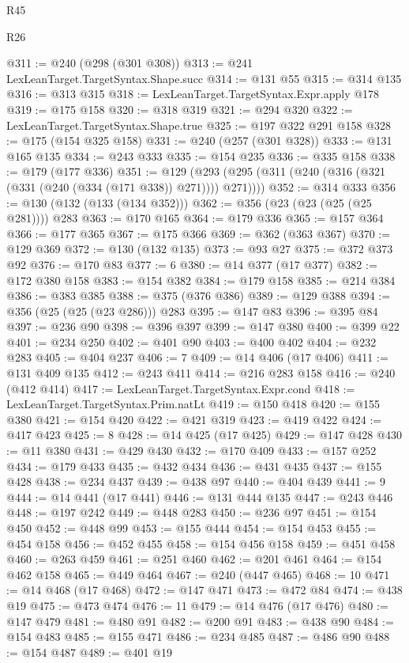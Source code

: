 \begin{lexlean}{R45}
\begin{lexlean}{R26}
\begin{coremodule}
{{{{{{{{{{{{{{{{{{{{{{{{{{{{{{{{{{{{{{{{{{{{{{{{{{{{{{{{{{{{{{{{{{{{{{{{@311 := @240 (@298 (@301 @308))
@313 := @241 LexLeanTarget.TargetSyntax.Shape.succ
@314 := @131 @55
@315 := @314 @135
@316 := @313 @315
@318 := LexLeanTarget.TargetSyntax.Expr.apply @178
@319 := @175 @158
@320 := @318 @319
@321 := @294 @320
@322 := LexLeanTarget.TargetSyntax.Shape.true
@325 := @197 @322 @291 @158
@328 := @175 (@154 @325 @158)
@331 := @240 (@257 (@301 @328))
@333 := @131 @165 @135
@334 := @243 @333
@335 := @154 @235
@336 := @335 @158
@338 := @179 (@177 @336)
@351 := @129 (@293 (@295 (@311 (@240 (@316 (@321 (@331 (@240 (@334 (@171 @338)) @271)))) @271))))
@352 := @314 @333
@356 := @130 (@132 (@133 (@134 @352)))
@362 := @356 (@23 (@23 (@25 (@25 @281)))) @283
@363 := @170 @165
@364 := @179 @336
@365 := @157 @364
@366 := @177 @365
@367 := @175 @366
@369 := @362 (@363 @367)
@370 := @129 @369
@372 := @130 (@132 @135)
@373 := @93 @27
@375 := @372 @373 @92
@376 := @170 @83
@377 := 6
@380 := @14 @377 (@17 @377)
@382 := @172 @380 @158
@383 := @154 @382
@384 := @179 @158
@385 := @214 @384
@386 := @383 @385
@388 := @375 (@376 @386)
@389 := @129 @388
@394 := @356 (@25 (@25 (@23 @286))) @283
@395 := @147 @83
@396 := @395 @84
@397 := @236 @90
@398 := @396 @397
@399 := @147 @380
@400 := @399 @22
@401 := @234 @250
@402 := @401 @90
@403 := @400 @402
@404 := @232 @283
@405 := @404 @237
@406 := 7
@409 := @14 @406 (@17 @406)
@411 := @131 @409 @135
@412 := @243 @411
@414 := @216 @283 @158
@416 := @240 (@412 @414)
@417 := LexLeanTarget.TargetSyntax.Expr.cond
@418 := LexLeanTarget.TargetSyntax.Prim.natLt
@419 := @150 @418
@420 := @155 @380
@421 := @154 @420
@422 := @421 @319
@423 := @419 @422
@424 := @417 @423
@425 := 8
@428 := @14 @425 (@17 @425)
@429 := @147 @428
@430 := @11 @380
@431 := @429 @430
@432 := @170 @409
@433 := @157 @252
@434 := @179 @433
@435 := @432 @434
@436 := @431 @435
@437 := @155 @428
@438 := @234 @437
@439 := @438 @97
@440 := @404 @439
@441 := 9
@444 := @14 @441 (@17 @441)
@446 := @131 @444 @135
@447 := @243 @446
@448 := @197 @242
@449 := @448 @283
@450 := @236 @97
@451 := @154 @450
@452 := @448 @99
@453 := @155 @444
@454 := @154 @453
@455 := @454 @158
@456 := @452 @455
@458 := @154 @456 @158
@459 := @451 @458
@460 := @263 @459
@461 := @251 @460
@462 := @201 @461
@464 := @154 @462 @158
@465 := @449 @464
@467 := @240 (@447 @465)
@468 := 10
@471 := @14 @468 (@17 @468)
@472 := @147 @471
@473 := @472 @84
@474 := @438 @19
@475 := @473 @474
@476 := 11
@479 := @14 @476 (@17 @476)
@480 := @147 @479
@481 := @480 @91
@482 := @200 @91
@483 := @438 @90
@484 := @154 @483
@485 := @155 @471
@486 := @234 @485
@487 := @486 @90
@488 := @154 @487
@489 := @401 @19
}}}}}}}}}}}}}}}}}}}}}}}}}}}}}}}}}}}}}}}}}}}}}}}}}}}}}}}}}}}}}}}}}}}}}}}}
\end{coremodule}
\end{lexlean}
\end{lexlean}
